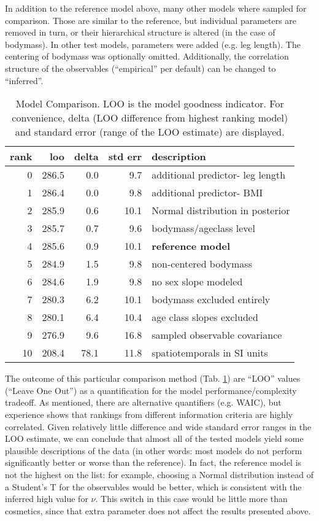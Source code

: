 In addition to the reference model above, many other models where sampled for comparison.
Those are similar to the reference, but individual parameters are removed in turn, or their hierarchical structure is altered (in the case of bodymass).
In other test models, parameters were added (e.g. leg length).
The centering of bodymass was optionally omitted.
Additionally, the correlation structure of the observables (``empirical'' per default) can be changed to ``inferred''.

\begin{table}[htbp]
\caption{\label{tab:stridemodelcomparison}Model Comparison. LOO is the model goodness indicator. For convenience, delta (LOO difference from highest ranking model) and standard error (range of the LOO estimate) are displayed.}
\centering
\begin{tabular}{rrrrl}
\textbf{rank} & \textbf{loo} & \textbf{delta} & \textbf{std err} & \textbf{description}\\[0pt]
\hline
0 & 286.5 & 0.0 & 9.7 & additional predictor- leg length\\[0pt]
1 & 286.4 & 0.0 & 9.8 & additional predictor- BMI\\[0pt]
2 & 285.9 & 0.6 & 10.1 & Normal distribution in posterior\\[0pt]
3 & 285.7 & 0.7 & 9.6 & bodymass/ageclass level\\[0pt]
4 & 285.6 & 0.9 & 10.1 & \textbf{reference model}\\[0pt]
5 & 284.9 & 1.5 & 9.8 & non-centered bodymass\\[0pt]
6 & 284.6 & 1.9 & 9.8 & no sex slope modeled\\[0pt]
7 & 280.3 & 6.2 & 10.1 & bodymass excluded entirely\\[0pt]
8 & 280.1 & 6.4 & 10.4 & age class slopes excluded\\[0pt]
9 & 276.9 & 9.6 & 16.8 & sampled observable covariance\\[0pt]
10 & 208.4 & 78.1 & 11.8 & spatiotemporals in SI units\\[0pt]
\end{tabular}
\end{table}


The outcome of this particular comparison method (Tab. \ref{tab:stridemodelcomparison}) are ``LOO'' values (``Leave One Out'') as a quantification for the model performance/complexity tradeoff.
As mentioned, there are alternative quantifiers (e.g. WAIC), but experience shows that rankings from different information criteria are highly correlated.
Given relatively little difference and wide standard error ranges in the LOO estimate, we can conclude that almost all of the tested models yield some plausible descriptions of the data (in other words: most models do not perform significantly better or worse than the reference).
In fact, the reference model is not the highest on the list: for example, choosing a Normal distribution instead of a Student's T for the observables would be better, which is consistent with the inferred high value for \(\nu\).
This switch in this case would be little more than cosmetics, since that extra parameter does not affect the results presented above.

